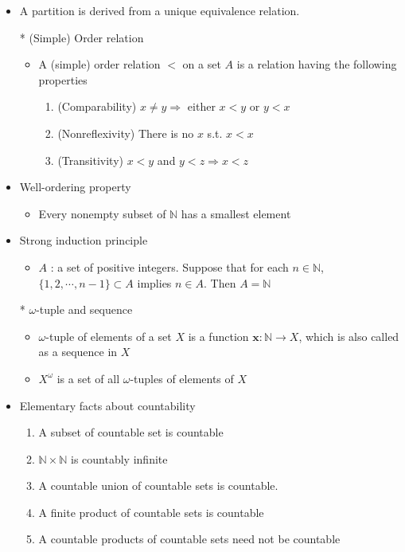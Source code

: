 \documentclass[12pt]{article}
\newcommand{\Nat}{\mathbb{N}}
\begin{document}
\begin{itemize}
	\item A partition is derived from a unique equivalence relation.
	\item[*] (Simple) Order relation
	\begin{itemize}
		\item A (simple) order relation $<$ on a set $A$ is a relation having the following properties
		\begin{enumerate}
			\item (Comparability) $x \neq y \Rightarrow$ either $x<y$ or $y<x$
			\item (Nonreflexivity) There is no $x$ s.t. $x<x$
			\item (Transitivity) $x<y$ and $y<z \Rightarrow x<z$
		\end{enumerate}
	\end{itemize}
	\item Well-ordering property
	\begin{itemize}
		\item Every nonempty subset of $\Nat$ has a smallest element 
	\end{itemize}
	\item Strong induction principle
	\begin{itemize}
		\item $A$ : a set of positive integers. Suppose that for each $n \in \Nat$, $\{1,2,\cdots,n-1\}\subset A$ implies $n\in A$. Then $A=\Nat$
	\end{itemize}
	\item[*] $\omega$-tuple and sequence
	\begin{itemize}
		\item $\omega$-tuple of elements of a set $X$ is a function $\textbf{x} : \Nat \rightarrow X$, which is also called as a sequence in $X$
		\item $X^{\omega}$ is a set of all $\omega$-tuples of elements of $X$
	\end{itemize}
	\item Elementary facts about countability
	\begin{enumerate}
		\item A subset of countable set is countable
		\item $\Nat \times \Nat$ is countably infinite
		\item A countable union of countable sets is countable.
		\item A finite product of countable sets is countable
		\item A countable products of countable sets need not be countable

\end{enumerate}
\end{itemize}
\end{document}
